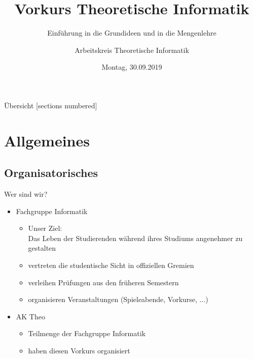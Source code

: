 

\title{Vorkurs Theoretische Informatik}
\subtitle{Einführung in die Grundideen und in die Mengenlehre}
\date{Montag, 30.09.2019}
\author{Arbeitskreis Theoretische Informatik}



\maketitle

\begin{frame}[fragile]{Übersicht}
  [sections numbered]
  \tableofcontents%
\end{frame}

\section{Allgemeines} 

\subsection{Organisatorisches}
\begin{frame}[fragile]{Wer sind wir?}
    \begin{itemize}
        \item 
            Fachgruppe Informatik
            \begin{itemize}
                \item Unser Ziel: \\
                Das Leben der Studierenden während ihres Studiums angenehmer zu gestalten
                \item vertreten die studentische Sicht in offiziellen Gremien
                \item verleihen Prüfungen aus den früheren Semestern
                \item organisieren Veranstaltungen (Spieleabende, Vorkurse, ...)
            \end{itemize}
        \item AK Theo
        \begin{itemize}
            \item Teilmenge der Fachgruppe Informatik
            \item haben diesen Vorkurs organisiert
        \end{itemize}
    \end{itemize}
\end{frame}

